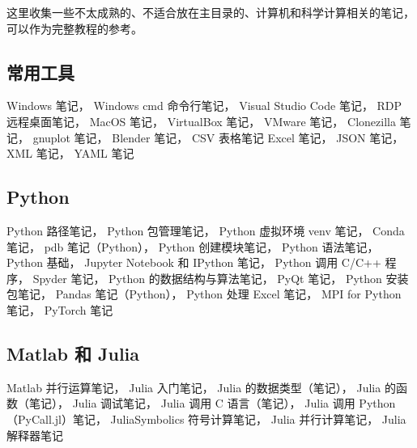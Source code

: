 
这里收集一些不太成熟的、不适合放在主目录的、计算机和科学计算相关的笔记，可以作为完整教程的参考。

\subsection{常用工具}
Windows 笔记，
Windows cmd 命令行笔记，
Visual Studio Code 笔记，
RDP 远程桌面笔记，
MacOS 笔记，
VirtualBox 笔记，
VMware 笔记，
Clonezilla 笔记，
gnuplot 笔记，
Blender 笔记，
CSV 表格笔记
Excel 笔记，
JSON 笔记，
XML 笔记，
YAML 笔记

\subsection{Python}
Python 路径笔记，
Python 包管理笔记，
Python 虚拟环境 venv 笔记，
Conda 笔记，
pdb 笔记（Python），
Python 创建模块笔记，
Python 语法笔记，
Python 基础，
Jupyter Notebook 和 IPython 笔记，
Python 调用 C/C++ 程序，
Spyder 笔记，
Python 的数据结构与算法笔记，
PyQt 笔记，
Python 安装包笔记，
Pandas 笔记（Python），
Python 处理 Excel 笔记，
MPI for Python 笔记，
PyTorch 笔记

\subsection{Matlab 和 Julia}
Matlab 并行运算笔记，
Julia 入门笔记，
Julia 的数据类型（笔记），
Julia 的函数（笔记），
Julia 调试笔记，
Julia 调用 C 语言（笔记），
Julia 调用 Python（PyCall.jl）笔记，
JuliaSymbolics 符号计算笔记，
Julia 并行计算笔记，
Julia 解释器笔记

